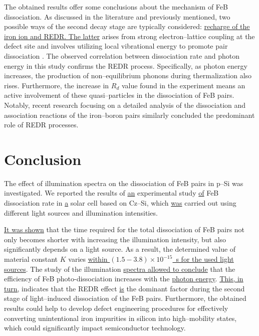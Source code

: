 \documentclass{WileyMSP-template}
\begin{document}
The obtained results offer some conclusions about the mechanism of FeB dissociation.
As discussed in the literature and previously mentioned, two possible ways of the second decay stage
are typically considered: \textcolor[rgb]{0.00,0.07,1.00}{\uline{recharge of the iron ion and REDR.
The latter}} arises from strong electron--lattice coupling at the defect site and involves utilizing local vibrational energy to promote pair dissociation
\cite{FeBAssJAP2014,Sun2021,Macdonald2004}.
The observed correlation between dissociation rate and photon energy in this study confirms the REDR process.
Specifically, as photon energy increases, the production of non--equilibrium phonons during thermalization also rises.
Furthermore, the increase in $R_d$ value found in the experiment means an active involvement of these quasi--particles in the dissociation of FeB pairs.
Notably, recent research \cite{Sun2021} focusing on a detailed analysis of the dissociation and association reactions of the iron--boron pairs similarly concluded the predominant role of REDR processes.



\section{Conclusion}\label{SecConsl}

The effect of illumination spectra on the dissociation of
FeB pairs in p--Si was investigated.
We reported the results of \textcolor[rgb]{0.00,0.07,1.00}{\uline{an}} experimental study \textcolor[rgb]{0.00,0.07,1.00}{\uline{of}} FeB dissociation rate in
\textcolor[rgb]{0.00,0.07,1.00}{\uline{a}} solar cell based on Cz--Si,
which \textcolor[rgb]{0.00,0.07,1.00}{\uline{was}} carried out using different light sources and illumination intensities.


\textcolor[rgb]{0.00,0.07,1.00}{\uline{It was shown}} that the time required for the total dissociation of FeB pairs
not only becomes shorter with increasing the illumination intensity, but also significantly depends
on a light source.
As a result, the determined value of material constant $K$  varies \textcolor[rgb]{0.00,0.07,1.00}{\uline{within
$(1.5-3.8)\times10^{-15}$~s
for the used light sources}}.
The study of the illumination \textcolor[rgb]{0.00,0.07,1.00}{\uline{spectra allowed to conclude}} that the efficiency of FeB photo-dissociation increases with the
\textcolor[rgb]{0.00,0.07,1.00}{\uline{photon energy}}.
\textcolor[rgb]{0.00,0.07,1.00}{\uline{This, in turn,}} indicates that
the REDR effect \textcolor[rgb]{0.00,0.07,1.00}{\uline{is}} the dominant factor during the second stage of light--induced dissociation of the FeB pairs.
Furthermore, the obtained results could help to develop defect engineering procedures
for effectively converting unintentional iron impurities in silicon into high--mobility states,
which could significantly impact semiconductor technology.
\end{document}
